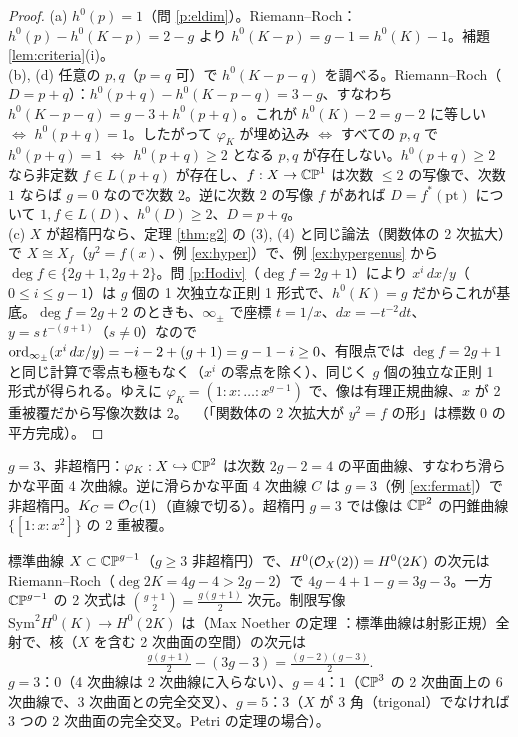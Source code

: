 \begin{proof}
(a) $h^0(p)=1$（問 \ref{p:eldim}）。Riemann--Roch：$h^0(p)-h^0(K-p)=2-g$ より $h^0(K-p)=g-1=h^0(K)-1$。補題 \ref{lem:criteria}(i)。\\
(b), (d) 任意の $p,q$（$p=q$ 可）で $h^0(K-p-q)$ を調べる。Riemann--Roch（$D=p+q$）：$h^0(p+q)-h^0(K-p-q)=3-g$、すなわち $h^0(K-p-q)=g-3+h^0(p+q)$。これが $h^0(K)-2=g-2$ に等しい $\iff$ $h^0(p+q)=1$。したがって $\varphi_K$ が埋め込み $\iff$ すべての $p,q$ で $h^0(p+q)=1$ $\iff$ $h^0(p+q)\ge2$ となる $p,q$ が存在しない。$h^0(p+q)\ge2$ なら非定数 $f\in L(p+q)$ が存在し、$f:X\to\mathbb{CP}^1$ は次数 $\le2$ の写像で、次数 $1$ ならば $g=0$ なので次数 $2$。逆に次数 $2$ の写像 $f$ があれば $D=f^*(\mathrm{pt})$ について $1,f\in L(D)$、$h^0(D)\ge2$、$D=p+q$。\\
(c) $X$ が超楕円なら、定理 \ref{thm:g2} の (3), (4) と同じ論法（関数体の 2 次拡大）で $X\cong X_f$（$y^2=f(x)$、例 \ref{ex:hyper}）で、例 \ref{ex:hypergenus} から $\deg f\in\{2g+1,2g+2\}$。問 \ref{p:Hodiv}（$\deg f=2g+1$）により $x^i\,dx/y$（$0\le i\le g-1$）は $g$ 個の 1 次独立な正則 1 形式で、$h^0(K)=g$ だからこれが基底。$\deg f=2g+2$ のときも、$\infty_\pm$ で座標 $t=1/x$、$dx=-t^{-2}dt$、$y=s\,t^{-(g+1)}$（$s\ne0$）なので $\operatorname{ord}_{\infty_\pm}(x^i\,dx/y)=-i-2+(g+1)=g-1-i\ge0$、有限点では $\deg f=2g+1$ と同じ計算で零点も極もなく（$x^i$ の零点を除く）、同じく $g$ 個の独立な正則 1 形式が得られる。ゆえに $\varphi_K=(1:x:\dots:x^{g-1})$ で、像は有理正規曲線、$x$ が 2 重被覆だから写像次数は $2$。\tC\ （「関数体の 2 次拡大が $y^2=f$ の形」は標数 $0$ の平方完成）。
\end{proof}
\begin{ex}[$g=3$]\label{ex:g3}
$g=3$、非超楕円：$\varphi_K:X\hookrightarrow\mathbb{CP}^2$ は次数 $2g-2=4$ の平面曲線、すなわち滑らかな平面 4 次曲線。逆に滑らかな平面 4 次曲線 $C$ は $g=3$（例 \ref{ex:fermat}）で非超楕円。$K_C=\mathcal O_C(1)$（直線で切る）。超楕円 $g=3$ では像は $\mathbb{CP}^2$ の円錐曲線 $\{[1:x:x^2]\}$ の 2 重被覆。
\end{ex}
\begin{ex}\label{ex:quadrics}
標準曲線 $X\subset\mathbb{CP}^{g-1}$（$g\ge3$ 非超楕円）で、$H^0(\mathcal O_X(2))=H^0(2K)$ の次元は Riemann--Roch（$\deg2K=4g-4>2g-2$）で $4g-4+1-g=3g-3$。一方 $\mathbb{CP}^{g-1}$ の 2 次式は $\binom{g+1}2=\frac{g(g+1)}2$ 次元。制限写像 $\mathrm{Sym}^2H^0(K)\to H^0(2K)$ は（Max Noether の定理 \tC：標準曲線は射影正規）全射で、核（$X$ を含む 2 次曲面の空間）の次元は
\[
\tfrac{g(g+1)}2-(3g-3)=\tfrac{(g-2)(g-3)}2.
\]
$g=3$：$0$（4 次曲線は 2 次曲線に入らない）、$g=4$：$1$（$\mathbb{CP}^3$ の 2 次曲面上の 6 次曲線で、3 次曲面との完全交叉）、$g=5$：$3$（$X$ が 3 角（trigonal）でなければ 3 つの 2 次曲面の完全交叉。Petri の定理の場合）\tC。
\end{ex}

